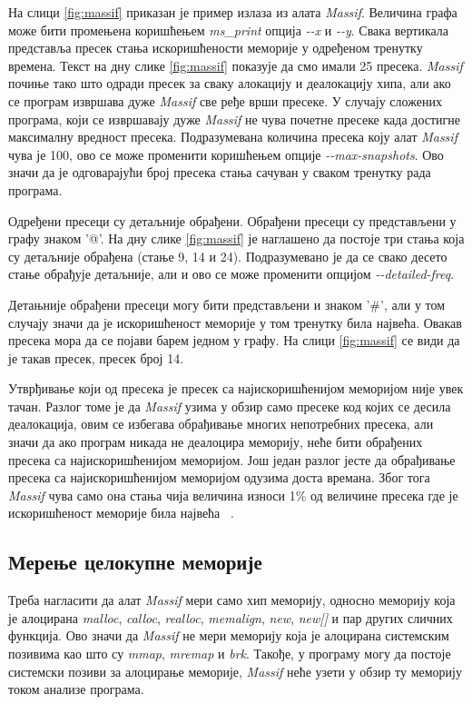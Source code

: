 \documentclass[12pt,oneside]{memoir}
\begin{document}
\indent На слици \ref{fig:massif} приказан је пример излаза из алата \textit{Massif}. Величина графа може бити промењена коришћењем \textit{ms\_print} опција \textit{-\--x} и \textit{-\--y}. Свака вертикала представља пресек стања искоришћености меморије у одређеном тренутку времена. Текст на дну слике \ref{fig:massif} показује да смо имали 25 пресека. \textit{Massif} почиње тако што одради пресек за сваку алокацију и деалокацију хипа, али ако се програм извршава дуже \textit{Massif} све ређе врши пресеке. У случају сложених програма, који се извршавају дуже \textit{Massif} не чува почетне пресеке када достигне максималну вредност пресека. Подразумевана количина пресека коју алат \textit{Massif} чува је 100, ово се може променити коришћењем опције \textit{-\--max-snapshots}. Ово значи да је одговарајући број пресека стања сачуван у сваком тренутку рада програма.

\indent Одређени пресеци су детаљније обрађени. Обрађени пресеци су представљени у графу знаком '@'. На дну слике \ref{fig:massif} је наглашено да постоје три стања која су детаљније обрађена (стање 9, 14 и 24). Подразумевано је да се свако десето стање обрађује детаљније, али и ово се може променити опцијом \textit{-\--detailed-freq}.

\indent Детањније обрађени пресеци могу бити представљени и знаком '\#', али у том случају значи да је искоришћеност меморије у том тренутку била највећа. Овакав пресека мора да се појави барем једном у графу. На слици \ref{fig:massif} се види да је такав пресек, пресек број 14.

\indent Утврђивање који од пресека је пресек са најискоришћенијом меморијом није увек тачан. Разлог томе је да \textit{Massif} узима у обзир само пресеке код којих се десила деалокација, овим се избегава обрађивање многих непотребних пресека, али значи да ако програм никада не деалоцира меморију, неће бити обрађених пресека са најискоришћенијом меморијом. Још један разлог јесте да обрађивање пресека са најискоришћенијом меморијом одузима доста времана. Због тога \textit{Massif} чува само она стања чија величина износи 1\% од величине пресека где је искоришћеност меморије била највећа ~\cite{massifdRef}. 

\subsection{Мерење целокупне меморије}


\indent Треба нагласити да алат \textit{Massif} мери само хип меморију, односно меморију која је алоцирана \textit{malloc}, \textit{calloc}, \textit{realloc}, \textit{memalign}, \textit{new}, \textit{new[]} и пар других сличних функција. Ово значи да \textit{Massif} не мери меморију која је алоцирана системским позивима као што су \textit{mmap}, \textit{mremap} и \textit{brk}. Такође, у програму могу да постоје системски позиви за алоцирање меморије, \textit{Massif} неће узети у обзир ту меморију током анализе програма.
\end{document}
